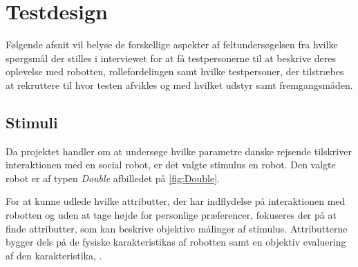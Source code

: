 \section*{Testdesign}
\label{Testdesign}
%
Følgende afsnit vil belyse de forskellige aspekter af feltundersøgelsen fra hvilke spørgsmål der stilles i interviewet for at få testpersonerne til at beskrive deres oplevelse med robotten, rollefordelingen samt hvilke testpersoner, der tilstræbes at rekruttere til hvor testen afvikles og med hvilket udstyr samt fremgangsmåden.

\subsection*{Stimuli}
\label{Stimuli}
%
Da projektet handler om at undersøge hvilke parametre danske rejsende tilskriver interaktionen med en social robot, er det valgte stimulus en robot. Den valgte robot er af typen \textit{Double} afbilledet på \autoref{fig:Double}.

For at kunne udlede hvilke attributter, der har indflydelse på interaktionen med robotten og uden at tage højde for personlige præferencer, fokuseres der på at finde attributter, som kan beskrive objektive målinger af stimulus. Attributterne bygger dels på de fysiske karakteristikas af robotten samt en objektiv evaluering af den karakteristika, \parencite[s. 2]{PDF:AttributeIdentificatoin}. 

